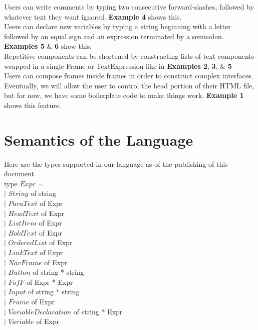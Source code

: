 \documentclass{article}
\begin{document}
Users can write comments by typing two consecutive forward-slashes, followed by whatever text they want ignored. \textbf{Example 4} shows this.\\

Users can declare new variables by typing a string beginning with a letter followed by an equal sign and an expression terminated by a semicolon. \textbf{Examples 5} \& \textbf{6} show this.\\

Repetitive components can be shortened by constructing lists of text components wrapped in a single Frame or TextExpression like in \textbf{Examples 2}, \textbf{3}, \& \textbf{5}\\

Users can compose frames inside frames in order to construct complex interfaces. Eventually, we will allow the user to control the head portion of their HTML file, but for now, we have some boilerplate code to make things work. \textbf{Example 1} shows this feature. 

\section{Semantics of the Language}

Here are the types supported in our language as of the publishing of this document.\\

type \(Expr\) = \\
$|$ \(String\) of string\\
$|$ \(ParaText\) of Expr\\
$|$ \(HeadText\) of Expr\\
$|$ \(ListItem\) of Expr\\
$|$ \(BoldText\) of Expr\\
$|$ \(OrderedList\) of Expr\\ 
$|$ \(LinkText\) of Expr\\
$|$ \(NavFrame\) of Expr\\
$|$ \(Button\) of string * string\\
$|$ \(FofF\) of Expr * Expr\\
$|$ \(Input\) of string * string\\
$|$ \(Frame\) of Expr\\
$|$ \(VariableDeclaration\) of string * Expr\\
$|$ \(Variable\) of Expr\\
\end{document}

